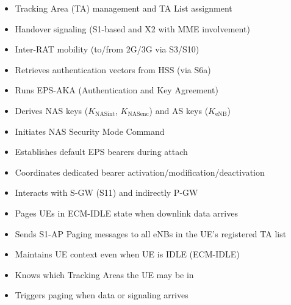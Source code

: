 
\begin{itemize}
\tightlist
\item
  Tracking Area (TA) management and TA List assignment
\item
  Handover signaling (S1-based and X2 with MME involvement)
\item
  Inter-RAT mobility (to/\allowbreak{}from 2G/\allowbreak{}3G via S3/\allowbreak{}S10)
\end{itemize}


\begin{itemize}
\tightlist
\item
  Retrieves authentication vectors from HSS (via S6a)
\item
  Runs EPS-AKA (Authentication and Key Agreement)
\item
  Derives NAS keys (\ensuremath{K_{\mathrm{NASint}}}, \ensuremath{K_{\mathrm{NASenc}}}) and AS keys (\ensuremath{K_{\mathrm{eNB}}})
\item
  Initiates NAS Security Mode Command
\end{itemize}


\begin{itemize}
\tightlist
\item
  Establishes default EPS bearers during attach
\item
  Coordinates dedicated bearer activation/\allowbreak{}modification/\allowbreak{}deactivation
\item
  Interacts with S-GW (S11) and indirectly P-GW
\end{itemize}


\begin{itemize}
\tightlist
\item
  Pages UEs in ECM-IDLE state when downlink data arrives
\item
  Sends S1-AP Paging messages to all eNBs in the UE’s registered TA list
\end{itemize}


\begin{itemize}
\tightlist
\item
  Maintains UE context even when UE is IDLE (ECM-IDLE)
\item
  Knows which Tracking Areas the UE may be in
\item
  Triggers paging when data or signaling arrives
\end{itemize}

